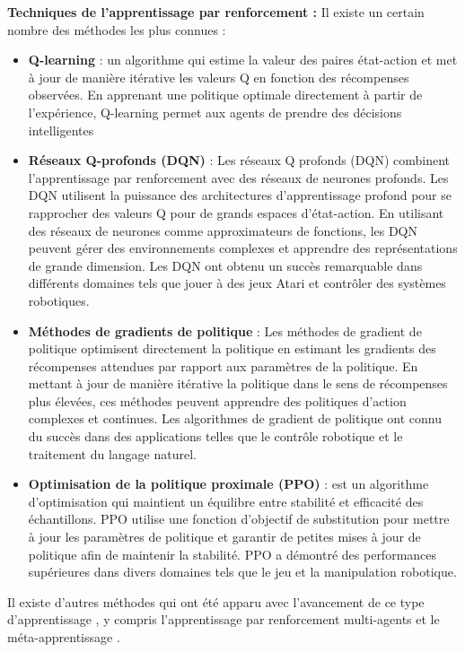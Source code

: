 \vspace{1cm}     
\textbf{Techniques de l'apprentissage par renforcement :}
Il existe un certain nombre des méthodes les plus connues \cite{basics_of_reinforcement_learning} :
\begin{itemize}[label=$\bullet$]
\item \textbf{Q-learning} : un algorithme qui estime la valeur des paires état-action et met à jour de manière itérative les valeurs Q en fonction des récompenses observées. En apprenant une politique optimale directement à partir de l'expérience, Q-learning permet aux agents de prendre des décisions intelligentes
\item \textbf{Réseaux Q-profonds (DQN)} : Les réseaux Q profonds (DQN) combinent l'apprentissage par renforcement avec des réseaux de neurones profonds. Les DQN utilisent la puissance des architectures d'apprentissage profond pour se rapprocher des valeurs Q pour de grands espaces d'état-action. En utilisant des réseaux de neurones comme approximateurs de fonctions, les DQN peuvent gérer des environnements complexes et apprendre des représentations de grande dimension. Les DQN ont obtenu un succès remarquable dans différents domaines tels que jouer à des jeux Atari et contrôler des systèmes robotiques.
\item \textbf{Méthodes de gradients de politique} : Les méthodes de gradient de politique optimisent directement la politique en estimant les gradients des récompenses attendues par rapport aux paramètres de la politique. En mettant à jour de manière itérative la politique dans le sens de récompenses plus élevées, ces méthodes peuvent apprendre des politiques d’action complexes et continues. Les algorithmes de gradient de politique ont connu du succès dans des applications telles que le contrôle robotique et le traitement du langage naturel.
\item \textbf{Optimisation de la politique proximale (PPO)} : est un algorithme d'optimisation qui maintient un équilibre entre stabilité et efficacité des échantillons. PPO utilise une fonction d'objectif de substitution pour mettre à jour les paramètres de politique et garantir de petites mises à jour de politique afin de maintenir la stabilité. PPO a démontré des performances supérieures dans divers domaines tels que le jeu et la manipulation robotique.
\end{itemize}
\vspace{1cm}
Il existe d'autres méthodes qui ont été apparu avec l'avancement de ce type d'apprentissage , y compris l'apprentissage par renforcement multi-agents et le méta-apprentissage .

